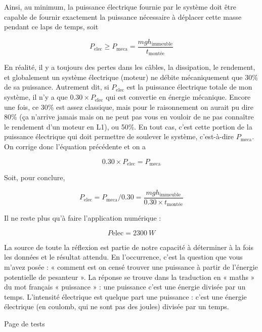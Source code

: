 \documentclass[10pt,a5paper,notitlepage]{book}
\begin{document}
Ainsi, au minimum, la puissance électrique fournie par le système doit être
capable de fournir exactement la puissance nécessaire à déplacer cette masse
pendant ce laps de temps, soit

\[P_\mathrm{elec} \geq P_\mathrm{meca} =
\frac{mgh_\mathrm{immeuble}}{t_\mathrm{montée}}\]

En réalité, il y a toujours des pertes dans les câbles, la dissipation, le
rendement, et globalement un système électrique (moteur) ne débite mécaniquement
que 30\% de sa puissance. Autrement dit, si $P_\mathrm{elec}$ est la puissance
électrique totale de mon système, il n'y a que $0.30\times P_\mathrm{elec}$ qui
est convertie en énergie mécanique. Encore une fois, ce 30\% est assez
classique, mais pour le raisonnement on aurait pu dire 80\% (ça n'arrive jamais
mais on ne peut pas vous en vouloir de ne pas connaître le rendement d'un moteur
en L1), ou 50\%. En tout cas, c'est cette portion de la puissance électrique qui
doit permettre de soulever le système, c'est-à-dire $P_\mathrm{meca}$. On
corrige donc l'équation précédente et on a

\[0.30\times P_\mathrm{elec} = P_\mathrm{meca}\]

Soit, pour conclure,

\[P_\mathrm{elec} = P_\mathrm{meca}/0.30 =
\frac{mgh_\mathrm{immeuble}}{0.30\times t_\mathrm{montée}}\]

Il ne reste plus qu'à faire l'application numérique :

\[ \boxed{P\mathrm{elec} = \SI{2300}{W}} \]

La source de toute la réflexion est partie de notre capacité à déterminer à la
fois les données et le résultat attendu. En l'occurrence, c'est la question que
vous m'avez posée : « comment est on censé trouver une puissance à partir de
l’énergie potentielle de pesanteur ». La réponse se trouve dans la traduction en
« maths » du mot français « puissance » : une puissance c'est une énergie
divisée par un temps. L'intensité électrique est quelque part une puissance :
c'est une énergie électrique (en coulomb, qui ne sont pas des joules) divisée
par un temps.

\newpage


\begin{center}
    \Huge Page de tests
\end{center}
\end{document}
